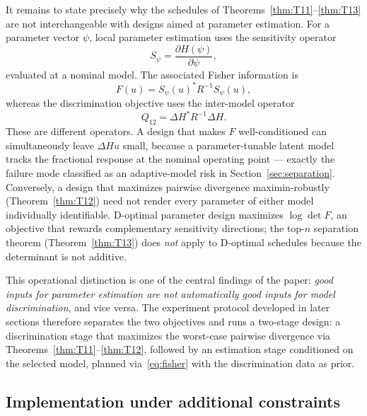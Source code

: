 It remains to state precisely why the schedules of Theorems~\ref{thm:T11}--\ref{thm:T13} are not interchangeable with designs aimed at parameter estimation. For a parameter vector \(\psi\), local parameter estimation uses the sensitivity operator
\begin{equation}
S_\psi = \frac{\partial H(\psi)}{\partial \psi},
\label{eq:sens_op}
\end{equation}
evaluated at a nominal model. The associated Fisher information is
\begin{equation}
F(u) = S_\psi(u)^{*} R^{-1} S_\psi(u),
\label{eq:fisher}
\end{equation}
whereas the discrimination objective uses the inter-model operator
\begin{equation}
Q_{12} = \Delta H^{*} R^{-1} \Delta H.
\label{eq:Q12_again}
\end{equation}
These are different operators. A design that makes \(F\) well-conditioned can simultaneously leave \(\Delta H u\) small, because a parameter-tunable latent model tracks the fractional response at the nominal operating point --- exactly the failure mode classified as an adaptive-model risk in Section~\ref{sec:separation}. Conversely, a design that maximizes pairwise divergence maximin-robustly (Theorem~\ref{thm:T12}) need not render every parameter of either model individually identifiable. D-optimal parameter design maximizes \(\log\det F\), an objective that rewards complementary sensitivity directions; the top-\(n\) separation theorem (Theorem~\ref{thm:T13}) does \emph{not} apply to D-optimal schedules because the determinant is not additive.

This operational distinction is one of the central findings of the paper: \emph{good inputs for parameter estimation are not automatically good inputs for model discrimination}, and vice versa. The experiment protocol developed in later sections therefore separates the two objectives and runs a two-stage design: a discrimination stage that maximizes the worst-case pairwise divergence via Theorems~\ref{thm:T11}--\ref{thm:T12}, followed by an estimation stage conditioned on the selected model, planned via~\eqref{eq:fisher} with the discrimination data as prior.

\subsection{Implementation under additional constraints}
\label{sec:constrained_impl}

